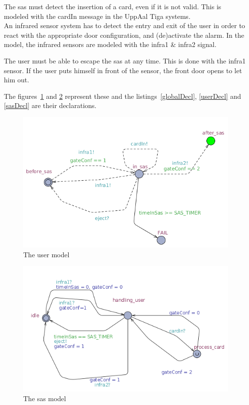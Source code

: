 The sas must detect the insertion of a card, even if it is not valid. This is modeled with the cardIn message in the UppAal Tiga systems.\\

An infrared sensor system has to detect the entry and exit of the user in order to react with the appropriate door configuration, and (de)activate the alarm. In the model, the infrared sensors are modeled with the infra1 \& infra2 signal.

The user must be able to escape the sas at any time. This is done with the infra1 sensor. If the user puts himself in front of the sensor, the front door opens to let him out.

The figures~\ref{userModel} and \ref{sasModel} represent these and the listings~\ref{globalDecl}, \ref{userDecl} and \ref{sasDecl} are their declarations.


\begin{figure}[!h]
	\centering
    \includegraphics[width=\textwidth]{User_model.png}
    \caption{The user model}
    \label{userModel}
\end{figure}

\begin{figure}[!h]
	\centering
    \includegraphics[width=\textwidth]{sasModel.png}
    \caption{The sas model}
    \label{sasModel}
\end{figure}

